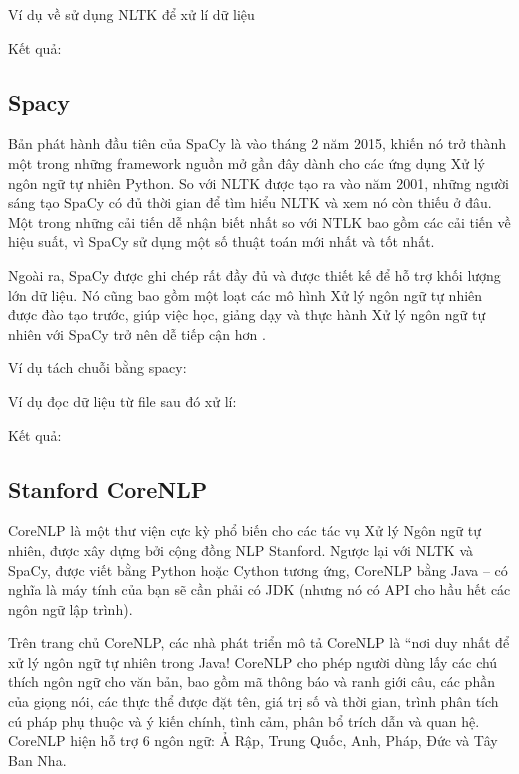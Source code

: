 Ví dụ về sử dụng NLTK để xử lí dữ liệu



Kết quả:



\subsection{Spacy}
Bản phát hành đầu tiên của SpaCy là vào tháng 2 năm 2015, khiến nó trở thành một trong những framework nguồn mở gần đây dành cho các ứng dụng Xử lý ngôn ngữ tự nhiên Python. So với NLTK được tạo ra vào năm 2001, những người sáng tạo SpaCy có đủ thời gian để tìm hiểu NLTK và xem nó còn thiếu ở đâu. Một trong những cải tiến dễ nhận biết nhất so với NTLK bao gồm các cải tiến về hiệu suất, vì SpaCy sử dụng một số thuật toán mới nhất và tốt nhất.

Ngoài ra, SpaCy được ghi chép rất đầy đủ và được thiết kế để hỗ trợ khối lượng lớn dữ liệu. Nó cũng bao gồm một loạt các mô hình Xử lý ngôn ngữ tự nhiên được đào tạo trước, giúp việc học, giảng dạy và thực hành Xử lý ngôn ngữ tự nhiên với SpaCy trở nên dễ tiếp cận hơn \cite{WEBSITE:3}. 

Ví dụ tách chuỗi bằng spacy:



Ví dụ đọc dữ liệu từ file sau đó xử lí:



Kết quả: 



\subsection{Stanford CoreNLP}
CoreNLP là một thư viện cực kỳ phổ biến cho các tác vụ Xử lý Ngôn ngữ tự nhiên, được xây dựng bởi cộng đồng NLP Stanford. Ngược lại với NLTK và SpaCy, được viết bằng Python hoặc Cython tương ứng, CoreNLP bằng Java – có nghĩa là máy tính của bạn sẽ cần phải có JDK (nhưng nó có API cho hầu hết các ngôn ngữ lập trình).

Trên trang chủ CoreNLP, các nhà phát triển mô tả CoreNLP là “nơi duy nhất để xử lý ngôn ngữ tự nhiên trong Java! CoreNLP cho phép người dùng lấy các chú thích ngôn ngữ cho văn bản, bao gồm mã thông báo và ranh giới câu, các phần của giọng nói, các thực thể được đặt tên, giá trị số và thời gian, trình phân tích cú pháp phụ thuộc và ý kiến chính, tình cảm, phân bổ trích dẫn và quan hệ. CoreNLP hiện hỗ trợ 6 ngôn ngữ: Ả Rập, Trung Quốc, Anh, Pháp, Đức và Tây Ban Nha.

